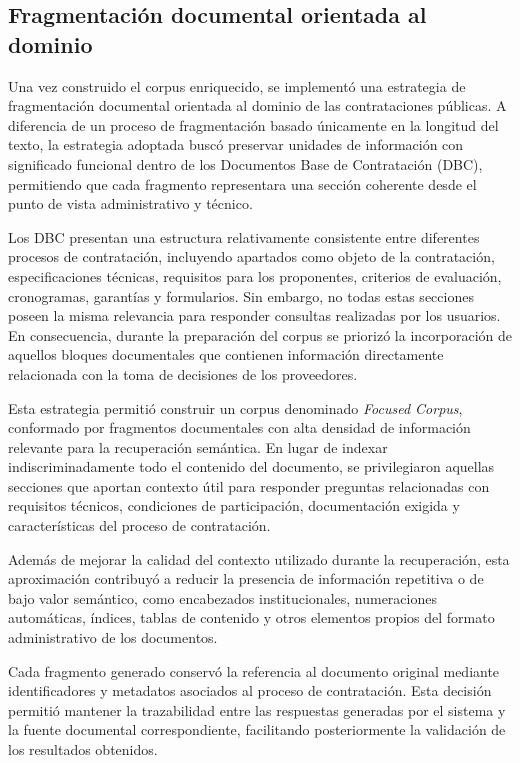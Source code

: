 \subsection{Fragmentación documental orientada al dominio}

Una vez construido el corpus enriquecido, se implementó una estrategia de fragmentación documental orientada al dominio de las contrataciones públicas. A diferencia de un proceso de fragmentación basado únicamente en la longitud del texto, la estrategia adoptada buscó preservar unidades de información con significado funcional dentro de los Documentos Base de Contratación (DBC), permitiendo que cada fragmento representara una sección coherente desde el punto de vista administrativo y técnico.

Los DBC presentan una estructura relativamente consistente entre diferentes procesos de contratación, incluyendo apartados como objeto de la contratación, especificaciones técnicas, requisitos para los proponentes, criterios de evaluación, cronogramas, garantías y formularios. Sin embargo, no todas estas secciones poseen la misma relevancia para responder consultas realizadas por los usuarios. En consecuencia, durante la preparación del corpus se priorizó la incorporación de aquellos bloques documentales que contienen información directamente relacionada con la toma de decisiones de los proveedores.

Esta estrategia permitió construir un corpus denominado \textit{Focused Corpus}, conformado por fragmentos documentales con alta densidad de información relevante para la recuperación semántica. En lugar de indexar indiscriminadamente todo el contenido del documento, se privilegiaron aquellas secciones que aportan contexto útil para responder preguntas relacionadas con requisitos técnicos, condiciones de participación, documentación exigida y características del proceso de contratación.

Además de mejorar la calidad del contexto utilizado durante la recuperación, esta aproximación contribuyó a reducir la presencia de información repetitiva o de bajo valor semántico, como encabezados institucionales, numeraciones automáticas, índices, tablas de contenido y otros elementos propios del formato administrativo de los documentos.

Cada fragmento generado conservó la referencia al documento original mediante identificadores y metadatos asociados al proceso de contratación. Esta decisión permitió mantener la trazabilidad entre las respuestas generadas por el sistema y la fuente documental correspondiente, facilitando posteriormente la validación de los resultados obtenidos.

